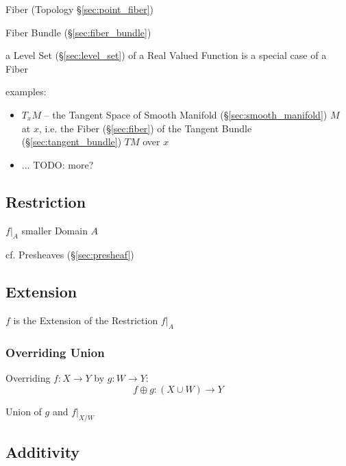 Fiber (Topology \S\ref{sec:point_fiber})

Fiber Bundle (\S\ref{sec:fiber_bundle})

a Level Set (\S\ref{sec:level_set}) of a Real Valued Function is a special case
of a Fiber

examples:
\begin{itemize}
  \item $T_x M$ -- the Tangent Space of Smooth Manifold
    (\S\ref{sec:smooth_manifold}) $M$ at $x$, i.e. the Fiber (\S\ref{sec:fiber})
    of the Tangent Bundle (\S\ref{sec:tangent_bundle}) $T M$ over $x$
  \item ... TODO: more?
\end{itemize}



\subsection{Restriction}\label{sec:function_restriction}

$f|_A$ smaller Domain $A$

cf. Presheaves (\S\ref{sec:presheaf})



\subsection{Extension}\label{sec:function_extension}

$f$ is the Extension of the Restriction $f|_A$



\subsubsection{Overriding Union}\label{sec:overriding_union}

Overriding $f : X \to Y$ by $g : W \to Y$:
\[
  f \oplus g : (X \cup W) \to Y
\]

Union of $g$ and $f|_{X/W}$



\subsection{Additivity}\label{sec:additivity}


